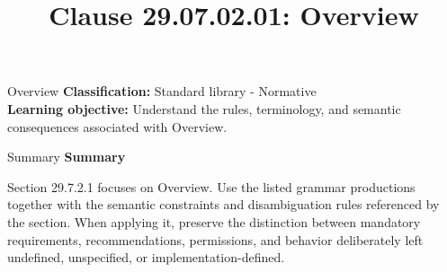 \documentclass[10pt,letterpaper]{article}
\title{Clause 29.07.02.01: Overview}
\author{}
\date{}
\begin{document}
\maketitle
\begin{CornellOverviewBox}{Overview}
\textbf{Classification:} Standard library - Normative\\[2pt]
\textbf{Learning objective:} Understand the rules, terminology, and semantic consequences associated with Overview.
\end{CornellOverviewBox}\begin{CornellSummaryBox}{Summary}
{\sffamily\bfseries\color{Accent} Summary}\par\vspace{3pt}Section 29.7.2.1 focuses on Overview. Use the listed grammar productions together with the semantic constraints and disambiguation rules referenced by the section. When applying it, preserve the distinction between mandatory requirements, recommendations, permissions, and behavior deliberately left undefined, unspecified, or implementation-defined.
\end{CornellSummaryBox}
\end{document}
